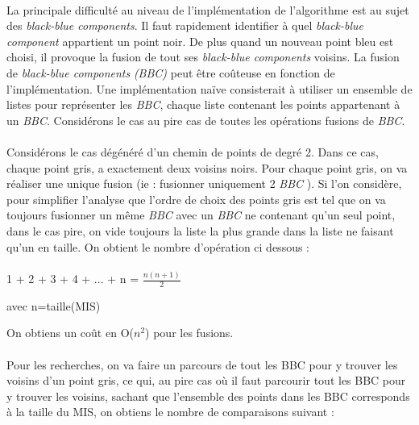 \paragraph{}
La principale difficulté au niveau de l'implémentation de l'algorithme est au sujet des \textit{black-blue components}. Il faut rapidement identifier à quel \textit{black-blue component} appartient un point noir.
De plus quand un nouveau point bleu est choisi, il provoque la fusion de tout ses \textit{black-blue components} voisins.
La fusion de \textit{black-blue components} \textit{(BBC)} peut être coûteuse en fonction de l'implémentation.
Une implémentation naïve consisterait à utiliser un ensemble de listes pour représenter les \textit{BBC}, chaque liste contenant les points appartenant à un \textit{BBC}.
Considérons le cas au pire cas de toutes les opérations fusions de \textit{BBC}.

\paragraph{}
Considérons le cas dégénéré d'un chemin de points de degré 2.
Dans ce cas, chaque point gris, a exactement deux voisins noirs.
Pour chaque point gris, on va réaliser une unique fusion (ie : fusionner uniquement 2 \textit{BBC} ).
Si l'on considère, pour simplifier l'analyse que l'ordre de choix des points gris est tel que on va toujours fusionner un même \textit{BBC} avec un \textit{BBC} ne contenant qu'un seul point, dans le cas pire, on vide toujours la liste la plus grande dans la liste ne faisant qu'un en taille. On obtient le nombre d'opération ci dessous :

\paragraph{}
1 + 2 + 3 + 4 + ... + n = \( \displaystyle \frac{n(n+1)}{2} \)

avec n=taille(MIS)

On obtiens un coût en O($n{^2}$) pour les fusions.

\paragraph{}
Pour les recherches, on va faire un parcours de tout les BBC pour y trouver les voisins d'un point gris, ce qui, au pire cas où il faut parcourir tout les BBC pour y trouver les voisins, sachant que l'ensemble des points dans les BBC corresponds à la taille du MIS, on obtiens le nombre de comparaisons suivant :

